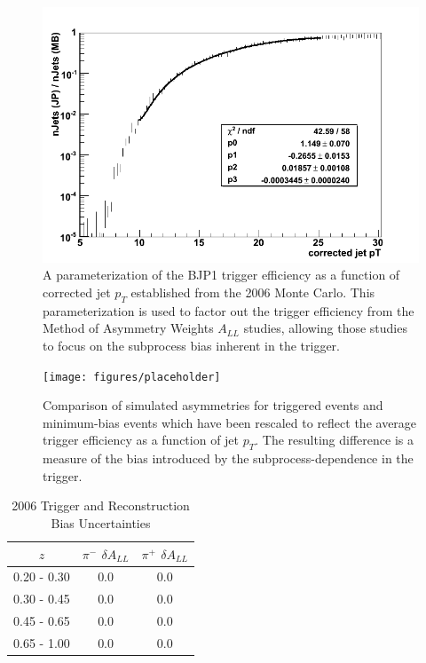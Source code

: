 \begin{figure}
  \includegraphics[width=1.0\textwidth]{figures/trigger-efficiency}
  \caption{A parameterization of the BJP1 trigger efficiency as a function of corrected jet $p_T$ established from the 2006 Monte Carlo.  This parameterization is used to factor out the trigger efficiency from the Method of Asymmetry Weights $A_{LL}$ studies, allowing those studies to focus on the subprocess bias inherent in the trigger.}
  \label{fig:trigger-efficiency}
\end{figure}

\begin{figure}
  \centering
  \texttt{[image: figures/placeholder]}
  \caption{Comparison of simulated asymmetries for triggered events and minimum-bias events which have been rescaled to reflect the average trigger efficiency as a function of jet $p_T$. The resulting difference is a measure of the bias introduced by the subprocess-dependence in the trigger.}
  \label{fig:trig-bias-2006}
\end{figure}

\begin{table}[ht]
    \begin{center}
        \begin{tabular}{c|c|c}
        \hline
        $z$ & $\pi^{-}$ $\delta A_{LL}$ & $\pi^{+}$ $\delta A_{LL}$\\
        \hline
        0.20 - 0.30 & 0.0 &  0.0 \\
        0.30 - 0.45 & 0.0 &  0.0 \\
        0.45 - 0.65 & 0.0 &  0.0 \\
        0.65 - 1.00 & 0.0 &  0.0 \\
    \hline
    \end{tabular}
    \end{center}
    \caption{2006 Trigger and Reconstruction Bias Uncertainties}
    \label{tab:trig-bias-2006}
\end{table}
